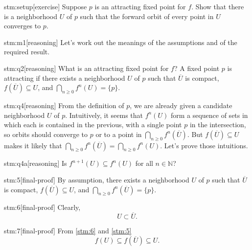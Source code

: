 
\begin{stm}{stm:setup}[exercise]
Suppose $p$ is an attracting fixed point for $f$. Show that there is a neighborhood $U$ of $p$ such that the forward orbit of every point in $U$ converges to $p$.
\end{stm}


\begin{stm}{stm:m1}[reasoning]
Let's work out the meanings of the assumptions and of the required result.
\end{stm}

\begin{stm}{stm:q2}[reasoning]
What is an attracting fixed point for $f$? A fixed point $p$ is attracting if there exists a neighborhood $U$ of $p$ such that $\overline{U}$ is compact, $f(\overline{U}) \subseteq U$, and $\bigcap_{n \ge 0} f^n(U) = \{p\}$.
\end{stm}

\begin{stm}{stm:q4}[reasoning]
From the definition of $p$, we are already given a candidate neighborhood $U$ of $p$. Intuitively, it seems that $f^n(U)$ form a sequence of sets in which each is contained in the previous, with a single point $p$ in the intersection, so orbits should converge to $p$ or to a point in $\bigcap_{n \ge 0} f^n(\overline{U})$. But $f(\overline{U}) \subseteq U$ makes it likely that $\bigcap_{n \ge 0} f^n(\overline{U}) = \bigcap_{n \ge 0} f^n(U)$. Let's prove those intuitions.
\end{stm}

\begin{stm}{stm:q4a}[reasoning]
Is $f^{n+1}(U) \subseteq f^n(U)$ for all $n \in \mathbb{N}$?
\end{stm}

\begin{stm}{stm:5}[final-proof]
By assumption, there exists a neighborhood $U$ of $p$ such that $\overline{U}$ is compact, $f(\overline{U}) \subseteq U$, and $\bigcap_{n \ge 0} f^n(\overline{U}) = \{p\}$.
\end{stm}


\begin{stm}{stm:6}[final-proof]
Clearly,
$$U \subset \overline{U}.$$
\end{stm}

\begin{stm}{stm:7}[final-proof]
From \ref{stm:6} and \ref{stm:5}
$$f(U) \subseteq f(\overline{U}) \subseteq U.$$
\end{stm}

